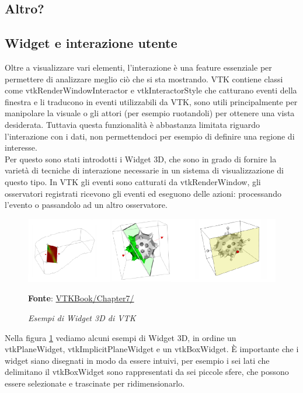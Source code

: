 \subsection{Altro?}\label{sec:aaa}

\subsection{Widget e interazione utente}\label{sec:widget-interazione}
Oltre a visualizzare vari elementi, l'interazione è una feature essenziale per permettere di analizzare meglio ciò che si sta mostrando. VTK contiene classi come vtkRenderWindowInteractor e vtkInteractorStyle che catturano eventi della finestra e li traducono in eventi utilizzabili da VTK, sono utili principalmente per manipolare la visuale o gli attori (per esempio ruotandoli) per ottenere una vista desiderata. Tuttavia questa funzionalità è abbastanza limitata riguardo l'interazione con i dati, non permettendoci per esempio di definire una regione di interesse.\\
Per questo sono stati introdotti i Widget 3D, che sono in grado di fornire la varietà di tecniche di interazione necessarie in un sistema di visualizzazione di questo tipo. In VTK gli eventi sono catturati da vtkRenderWindow, gli osservatori registrati ricevono gli eventi ed eseguono delle azioni: processando l'evento o passandolo ad un altro osservatore.

\begin{figure}[h]
    \centering
    \includegraphics[scale=0.5]{immagini/volumerendering/widgets.png}
    \caption{\textit{Esempi di Widget 3D di VTK}}
    \textbf{Fonte}: \href{https://lorensen.github.io/VTKExamples/site/VTKBook/07Chapter7/}{VTKBook/Chapter7/}
    \label{fig: VTK 3D Widgets}
\end{figure}

Nella figura \ref{fig: VTK 3D Widgets} vediamo alcuni esempi di Widget 3D, in ordine un vtkPlaneWidget, vtkImplicitPlaneWidget e un vtkBoxWidget. \`E importante che i widget siano disegnati in modo da essere intuivi, per esempio i sei lati che delimitano il vtkBoxWidget sono rappresentati da sei piccole sfere, che possono essere selezionate e trascinate per ridimensionarlo.

